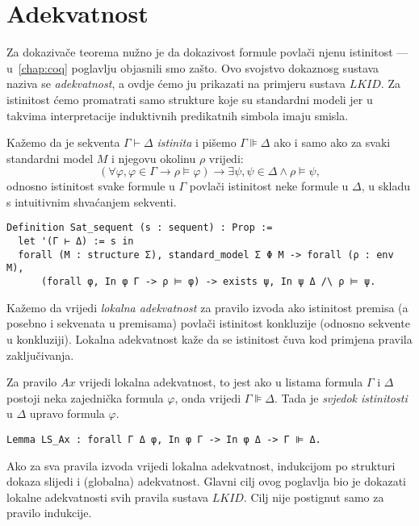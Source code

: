 \section{Adekvatnost}\label{sec:adekvatnost}
Za dokazivače teorema nužno je da dokazivost formule povlači njenu istinitost ---
u~\ref{chap:coq} poglavlju objasnili smo zašto.
Ovo svojstvo dokaznosg sustava naziva se \textit{adekvatnost},
a ovdje ćemo ju prikazati na primjeru sustava \(\mathit{LKID}\).
Za istinitost ćemo promatrati samo strukture koje su standardni modeli
jer u takvima interpretacije induktivnih predikatnih simbola imaju smisla.

\begin{definition}
  Kažemo da je sekventa \(\Gamma \vdash \Delta\) \textit{istinita} i pišemo \(\Gamma \VDash \Delta\) ako i samo ako
  za svaki standardni model \(M\) i njegovu okolinu \(\rho\) vrijedi:
  \[
    (\forall \varphi, \varphi \in \Gamma \rightarrow \rho \vDash \varphi) \rightarrow \exists \psi, \psi \in \Delta \land \rho \vDash \psi,
  \]
  \noindent odnosno istinitost svake formule u \(\Gamma\) povlači istinitost neke formule u \(\Delta\),
  u skladu s intuitivnim shvaćanjem sekventi.
\begin{verbatim}
Definition Sat_sequent (s : sequent) : Prop :=
  let '(Γ ⊢ Δ) := s in            
  forall (M : structure Σ), standard_model Σ Φ M -> forall (ρ : env M),
      (forall φ, In φ Γ -> ρ ⊨ φ) -> exists ψ, In ψ Δ /\ ρ ⊨ ψ.
\end{verbatim}
\end{definition}

Kažemo da vrijedi \textit{lokalna adekvatnost} za pravilo izvoda
ako istinitost premisa (a posebno i sekvenata u premisama) povlači istinitost konkluzije (odnosno sekvente u konkluziji).
Lokalna adekvatnost kaže da se istinitost čuva kod primjena pravila zaključivanja.

\begin{example}
  Za pravilo \(\mathit{Ax}\) vrijedi lokalna adekvatnost,
  to jest ako u listama formula \(\Gamma\) i \(\Delta\) postoji neka zajednička formula \(\varphi\),
  onda vrijedi \(\Gamma \VDash \Delta\). Tada je \textit{svjedok istinitosti} u \(\Delta\) upravo formula \(\varphi\).
\begin{verbatim}
Lemma LS_Ax : forall Γ Δ φ, In φ Γ -> In φ Δ -> Γ ⊫ Δ.
\end{verbatim}
\end{example}

Ako za sva pravila izvoda vrijedi lokalna adekvatnost,
indukcijom po strukturi dokaza slijedi i (globalna) adekvatnost.
Glavni cilj ovog poglavlja bio je dokazati lokalne adekvatnosti svih pravila sustava \(\mathit{LKID}\).
Cilj nije postignut samo za pravilo indukcije.

